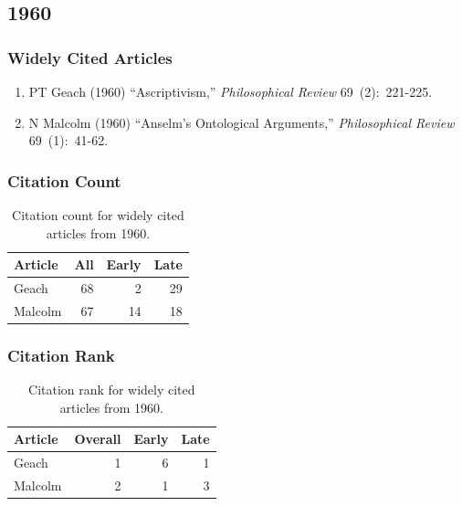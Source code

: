 \documentclass[
  10pt,
  letterpaper,
  DIV=11,
  numbers=noendperiod,
  twoside]{scrartcl}
\providecommand{\tightlist}{%
  \setlength{\itemsep}{0pt}\setlength{\parskip}{0pt}}\usepackage{longtable,booktabs,array}
\begin{document}
\newpage

\subsection{1960}\label{sec-s1960}

\subsubsection*{Widely Cited Articles}\label{widely-cited-articles-4}

\begin{enumerate}
\def\labelenumi{\arabic{enumi}.}
\tightlist
\item
  PT Geach (1960) ``Ascriptivism,'' \emph{Philosophical Review}
  69~(2):~221-225.
\item
  N Malcolm (1960) ``Anselm's Ontological Arguments,''
  \emph{Philosophical Review} 69~(1):~41-62.
\end{enumerate}

\subsubsection*{Citation Count}\label{sec-count-1960}

\begin{longtable}[]{@{}lrrr@{}}

\caption{\label{tbl-citation-count-1960}Citation count for widely cited
articles from 1960.}

\tabularnewline

\toprule\noalign{}
Article & All & Early & Late \\
\midrule\noalign{}
\endhead
\bottomrule\noalign{}
\endlastfoot
Geach & 68 & 2 & 29 \\
Malcolm & 67 & 14 & 18 \\

\end{longtable}

\subsubsection*{Citation Rank}\label{sec-rank-1960}

\begin{longtable}[]{@{}lrrr@{}}

\caption{\label{tbl-citation-rank-1960}Citation rank for widely cited
articles from 1960.}

\tabularnewline

\toprule\noalign{}
Article & Overall & Early & Late \\
\midrule\noalign{}
\endhead
\bottomrule\noalign{}
\endlastfoot
Geach & 1 & 6 & 1 \\
Malcolm & 2 & 1 & 3 \\

\end{longtable}
\end{document}
